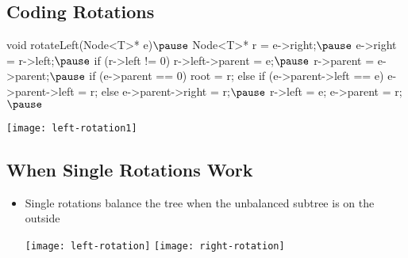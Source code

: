 
\begin{slide}
\section{Coding Rotations}

\begin{minipage}{10cm}
\begin{java}
void rotateLeft(Node<T>* e)$\pause$
{
  Node<T>* r = e->right;$\pause$
  e->right = r->left;$\pause$
  if (r->left != 0)
     r->left->parent = e;$\pause$
  r->parent = e->parent;$\pause$
  if (e->parent == 0)
     root = r;
  else if (e->parent->left == e)
     e->parent->left = r;
  else
     e->parent->right = r;$\pause$
  r->left = e;
  e->parent = r;
}$\pause$
\end{java}
\end{minipage}
\begin{minipage}{14cm}
\vspace*{-1ex}
\texttt{[image: left-rotation1]}
\end{minipage}
\end{slide}


\begin{slide}
\section{When Single Rotations Work}

\begin{PauseHighLight}
  \begin{itemize}
  \item Single rotations balance the tree when the unbalanced subtree is
    on the outside
    \begin{center}
      \texttt{[image: left-rotation]}\hfil
      \texttt{[image: right-rotation]}\pause
    \end{center}
  \end{itemize}
\end{PauseHighLight}

\end{slide}


